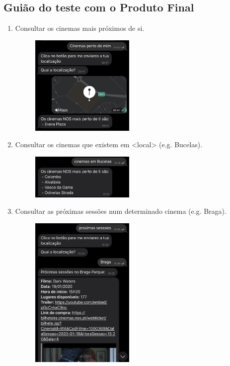 \documentclass[11pt, a4paper]{article}
\begin{document}
\begin{appendices}
\section{Guião do teste com o Produto Final}
\begin{enumerate}
    \item Consultar os cinemas mais próximos de si.
    \begin{figure}[H]
        \centering
        \includegraphics[width=5cm]{images/guiaoR/1.png}
    \end{figure}
    \item Consultar os cinemas que existem em <local> (e.g. Bucelas).
    \begin{figure}[H]
        \centering
        \includegraphics[width=5cm]{images/guiaoR/2.jpg}
    \end{figure}
    \item Consultar as próximas sessões num determinado cinema (e.g. Braga).
    \begin{figure}[H]
        \centering
        \includegraphics[width=5cm]{images/guiaoR/3.jpg}
    \end{figure}

\end{enumerate}
\end{appendices}
\end{document}

